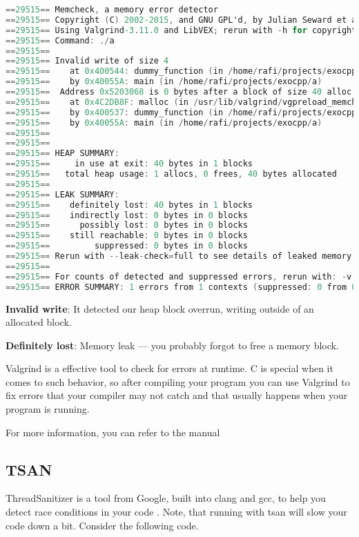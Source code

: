 \begin{lstlisting}[language=C]
==29515== Memcheck, a memory error detector
==29515== Copyright (C) 2002-2015, and GNU GPL'd, by Julian Seward et al.
==29515== Using Valgrind-3.11.0 and LibVEX; rerun with -h for copyright info
==29515== Command: ./a
==29515==
==29515== Invalid write of size 4
==29515==    at 0x400544: dummy_function (in /home/rafi/projects/exocpp/a)
==29515==    by 0x40055A: main (in /home/rafi/projects/exocpp/a)
==29515==  Address 0x5203068 is 0 bytes after a block of size 40 alloc'd
==29515==    at 0x4C2DB8F: malloc (in /usr/lib/valgrind/vgpreload_memcheck-amd64-linux.so)
==29515==    by 0x400537: dummy_function (in /home/rafi/projects/exocpp/a)
==29515==    by 0x40055A: main (in /home/rafi/projects/exocpp/a)
==29515==
==29515==
==29515== HEAP SUMMARY:
==29515==     in use at exit: 40 bytes in 1 blocks
==29515==   total heap usage: 1 allocs, 0 frees, 40 bytes allocated
==29515==
==29515== LEAK SUMMARY:
==29515==    definitely lost: 40 bytes in 1 blocks
==29515==    indirectly lost: 0 bytes in 0 blocks
==29515==      possibly lost: 0 bytes in 0 blocks
==29515==    still reachable: 0 bytes in 0 blocks
==29515==         suppressed: 0 bytes in 0 blocks
==29515== Rerun with --leak-check=full to see details of leaked memory
==29515==
==29515== For counts of detected and suppressed errors, rerun with: -v
==29515== ERROR SUMMARY: 1 errors from 1 contexts (suppressed: 0 from 0)
\end{lstlisting}

\textbf{Invalid write}: It detected our heap block overrun, writing outside of an allocated block.

\textbf{Definitely lost}: Memory leak --- you probably forgot to free a memory block.

Valgrind is a effective tool to check for errors at runtime. C is special when it comes to such behavior, so after compiling your program you can use Valgrind to fix errors that your compiler may not catch and that usually happens when your program is running.

For more information, you can refer to the manual \cite{valgrind}

\subsection{TSAN}

ThreadSanitizer is a tool from Google, built into clang and gcc, to help you detect race conditions in your code \cite{threadsanitizercppmanual_2018}.
Note, that running with tsan will slow your code down a bit. Consider the following code.

